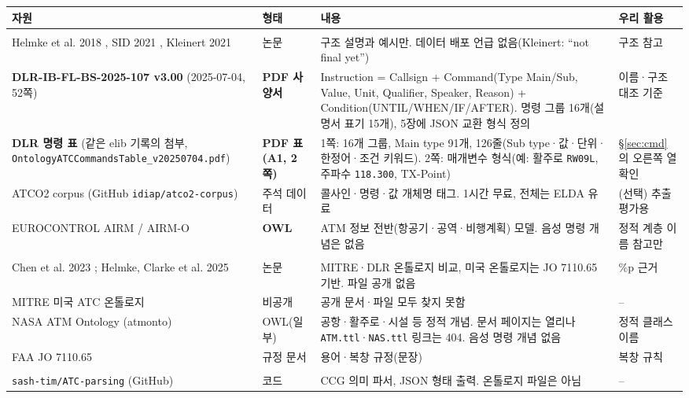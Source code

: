 \documentclass[10pt,a4paper]{article}
\begin{document}
\begin{center}\footnotesize
\begin{longtable}{@{}>{\raggedright\arraybackslash}p{3.6cm}>{\raggedright\arraybackslash}p{2.0cm}>{\raggedright\arraybackslash}p{5.0cm}>{\raggedright\arraybackslash}p{3.6cm}@{}}
\toprule
자원 & 형태 & 내용 & 우리 활용\\\midrule\endhead
\multicolumn{4}{@{}l}{\textit{유럽 (SESAR / DLR)}}\\
Helmke et al. 2018 \cite{helmke2018}, SID 2021 \cite{helmke2021sid}, Kleinert 2021 \cite{kleinert2021} & 논문 & 구조 설명과 예시만. 데이터 배포 언급 없음(Kleinert: ``not final yet'') & 구조 참고\\
\textbf{DLR-IB-FL-BS-2025-107 v3.00} \cite{dlr2025} (2025-07-04, 52쪽) & \textbf{PDF 사양서} & Instruction = Callsign + Command(Type Main/Sub, Value, Unit, Qualifier, Speaker, Reason) + Condition(UNTIL/WHEN/IF/AFTER). 명령 그룹 16개(설명서 표기 15개), 5장에 JSON 교환 형식 정의 & 이름·구조 대조 기준\\
\textbf{DLR 명령 표} (같은 elib 기록의 첨부, \texttt{OntologyATC\allowbreak CommandsTable\_\allowbreak v20250704.pdf}) & \textbf{PDF 표 (A1, 2쪽)} & 1쪽: 16개 그룹, Main type 91개, 126줄(Sub type·값·단위·한정어·조건 키워드). 2쪽: 매개변수 형식(예: 활주로 \texttt{RW09L}, 주파수 \texttt{118.300}, TX-Point) & \S\ref{sec:cmd}의 오른쪽 열 확인\\
ATCO2 corpus (GitHub \texttt{idiap/atco2-corpus}) & 주석 데이터 & 콜사인·명령·값 개체명 태그. 1시간 무료, 전체는 ELDA 유료 & (선택) 추출 평가용\\
EUROCONTROL AIRM / AIRM-O & \textbf{OWL} & ATM 정보 전반(항공기·공역·비행계획) 모델. 음성 명령 개념은 없음 & 정적 계층 이름 참고만\\
\multicolumn{4}{@{}l}{\textit{미국 (MITRE / NASA / FAA)}}\\
Chen et al. 2023 \cite{chen2023}; Helmke, Clarke et al. 2025 \cite{helmke2025loss} & 논문 & MITRE·DLR 온톨로지 비교, 미국 온톨로지는 JO 7110.65 기반. 파일 공개 없음 & 2.6\%p 근거\\
MITRE 미국 ATC 온톨로지 & 비공개 & 공개 문서·파일 모두 찾지 못함 & --\\
NASA ATM Ontology (atmonto) \cite{keller2017} & OWL(일부) & 공항·활주로·시설 등 정적 개념. 문서 페이지는 열리나 \texttt{ATM.ttl}·\texttt{NAS.ttl} 링크는 404. 음성 명령 개념 없음 & 정적 클래스 이름\\
FAA JO 7110.65 \cite{faa7110} & 규정 문서 & 용어·복창 규정(문장) & 복창 규칙\\
\multicolumn{4}{@{}l}{\textit{기타}}\\
\texttt{sash-tim/ATC-parsing} (GitHub) & 코드 & CCG 의미 파서, JSON 형태 출력. 온톨로지 파일은 아님 & --\\
\bottomrule
\end{longtable}
\end{center}
\end{document}
